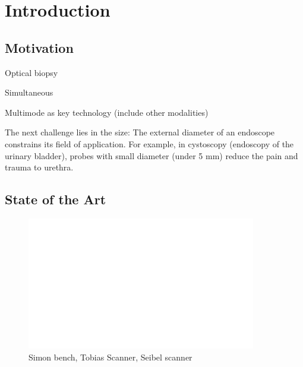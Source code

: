 %

\chapter{Introduction}
\label{Ch:Introduction}


\section{Motivation}

Optical biopsy

Simultaneous

Multimode as key technology (include other modalities)

The next challenge lies in the size: The external diameter of an endoscope constrains its field of application. For example, in cystoscopy (endoscopy of the urinary bladder), probes with small diameter (under 5 mm) reduce the pain and trauma to urethra.





\clearpage
\section{State of the Art}
\begin{figure}[h!]
      \centering
      \includegraphics[width=10cm,draft]{figures/foo.png}
      \caption{Simon bench, Tobias Scanner, Seibel scanner}
\end{figure}


\clearpage
